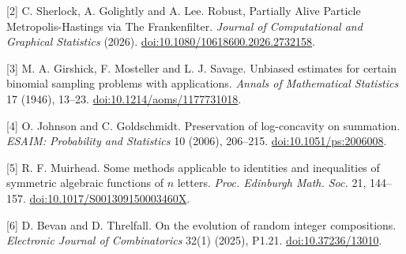 \documentclass[11pt]{article}
\begin{document}
[2] C. Sherlock, A. Golightly and A. Lee. Robust, Partially Alive Particle Metropolis-Hastings via The Frankenfilter. \emph{Journal of Computational and Graphical Statistics} (2026). \href{https://doi.org/10.1080/10618600.2026.2732158}{doi:10.1080/10618600.2026.2732158}.

[3] M. A. Girshick, F. Mosteller and L. J. Savage. Unbiased estimates for certain binomial sampling problems with applications. \emph{Annals of Mathematical Statistics} 17 (1946), 13--23. \href{https://doi.org/10.1214/aoms/1177731018}{doi:10.1214/aoms/1177731018}.

[4] O. Johnson and C. Goldschmidt. Preservation of log-concavity on summation. \emph{ESAIM: Probability and Statistics} 10 (2006), 206--215. \href{https://doi.org/10.1051/ps:2006008}{doi:10.1051/ps:2006008}.

[5] R. F. Muirhead. Some methods applicable to identities and inequalities of symmetric algebraic functions of $n$ letters. \emph{Proc. Edinburgh Math. Soc.} 21, 144--157. \href{https://doi.org/10.1017/S001309150003460X}{doi:10.1017/S001309150003460X}.

[6] D. Bevan and D. Threlfall. On the evolution of random integer compositions. \emph{Electronic Journal of Combinatorics} 32(1) (2025), P1.21. \href{https://doi.org/10.37236/13010}{doi:10.37236/13010}.
\end{document}
